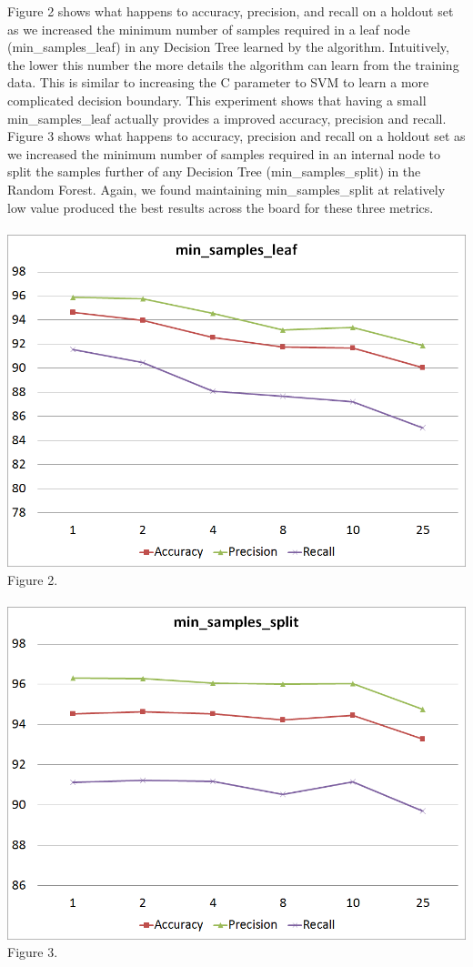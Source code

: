 \documentclass[twoside,11pt]{homework}
\begin{document}
Figure 2 shows what happens to accuracy, precision, 
and recall on a holdout set as we increased the minimum number of samples required in a leaf node (min\_samples\_leaf) in any 
Decision Tree learned by the algorithm. Intuitively, the lower this number the more details the algorithm can learn 
from the training data. This is similar to increasing the C parameter to SVM to learn a more complicated decision boundary.
This experiment shows that having a small min\_samples\_leaf actually provides a improved accuracy, precision and recall.
Figure 3 shows what happens to accuracy, precision and recall on a holdout set as we increased the minimum number of
samples required in an internal node to split the samples further of any Decision Tree (min\_samples\_split) in the Random Forest.
Again, we found maintaining min\_samples\_split at relatively low value produced the best results across the board for these three metrics.
\\
\\
\includegraphics[scale=0.5]{min_leaf.png}
\\
Figure 2.
\\
\\
\includegraphics[scale=0.5]{min_split.png}
\\
Figure 3.
\\
\end{document}
